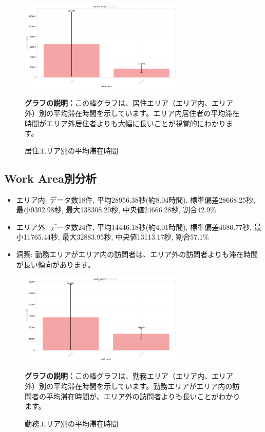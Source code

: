 \documentclass[11pt,a4paper]{article}
\begin{document}
\begin{figure}[H]
    \centering
    \includegraphics[width=0.7\textwidth]{images/home_area_bar_chart.png}
    \caption{居住エリア別の平均滞在時間}
    \label{fig:home_area}
    \textbf{グラフの説明：}この棒グラフは、居住エリア（エリア内、エリア外）別の平均滞在時間を示しています。エリア内居住者の平均滞在時間がエリア外居住者よりも大幅に長いことが視覚的にわかります。
\end{figure}

\subsection{Work Area別分析}

\begin{itemize}
    \item エリア内: データ数18件, 平均28956.38秒(約8.04時間), 標準偏差28668.25秒, 最小9392.98秒, 最大138308.20秒, 中央値24666.28秒, 割合42.9\%
    \item エリア外: データ数24件, 平均14446.18秒(約4.01時間), 標準偏差4680.77秒, 最小11765.44秒, 最大32883.95秒, 中央値13113.17秒, 割合57.1\%
    \item 洞察: 勤務エリアがエリア内の訪問者は、エリア外の訪問者よりも滞在時間が長い傾向があります。
\end{itemize}

\begin{figure}[H]
    \centering
    \includegraphics[width=0.7\textwidth]{images/work_area_bar_chart.png}
    \caption{勤務エリア別の平均滞在時間}
    \label{fig:work_area}
    \textbf{グラフの説明：}この棒グラフは、勤務エリア（エリア内、エリア外）別の平均滞在時間を示しています。勤務エリアがエリア内の訪問者の平均滞在時間が、エリア外の訪問者よりも長いことがわかります。
\end{figure}
\end{document}
